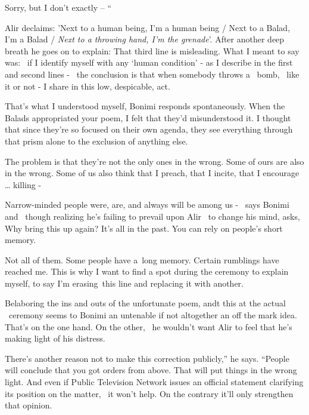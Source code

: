 \documentclass[letterpaper]{article}
\begin{document}
{\textquotedbl}Sorry, but I don't exactly -- `` 

Alir declaims: {\textquotedbl}'Next to a human being, I'm a human being / Next to a Balad, I'm a Balad / \textit{Next to
a throwing hand, I'm the grenade}{}'.{\textquotedbl} After another deep breath he goes on to explain:
{\textquotedbl}That third line is misleading. What I meant to say was:~ if I identify myself with any `human condition'
- as I describe in the first and second lines -~ the conclusion is that when somebody throws a~ bomb,~ like it or not -
I share in this low, despicable, act. {\textquotedbl} 

{\textquotedbl}That's what I understood myself,{\textquotedbl} Bonimi responds spontaneously. {\textquotedbl}When the
Balads appropriated your poem, I felt that they'd misunderstood it. I thought that since they're so focused on their
own agenda, they see everything through that prism alone to the exclusion of anything else.{\textquotedbl} 

{\textquotedbl}The problem is that they're not the only ones in the wrong. Some of ours are also in the wrong. Some of
us also think that I preach, that I incite, that I encourage {\dots} killing -{\textquotedbl} 

{\textquotedbl}Narrow-minded people were, are, and always will be among us - {\textquotedbl} \ says Bonimi and \ though
realizing he's failing to prevail upon Alir \ to change his mind, asks, {\textquotedbl}Why bring this up again? It's
all in the past. You can rely on people's short memory.{\textquotedbl} 

{\textquotedbl}Not all of them. Some people have a~long memory. Certain rumblings have reached me. This is why I want to
find a spot during the ceremony to explain myself, to say I'm erasing~this line and replacing it with
another.{\textquotedbl}

Belaboring the ins and outs of the unfortunate poem, andt this at the actual \ ceremony seems to Bonimi an untenable if
not altogether an off the mark idea. That's on the one hand. On the other, \ he wouldn't want Alir to feel that he's
making light of his distress. 

{\textquotedbl}There's another reason not to make this correction publicly,'' he says. ``People will conclude that you
got orders from above. That will put things in the wrong light. And even if Public Television Network issues an
official statement clarifying its position on the matter, \ it won't help. On the contrary it'll only strengthen that
opinion.{\textquotedbl} 
\end{document}
